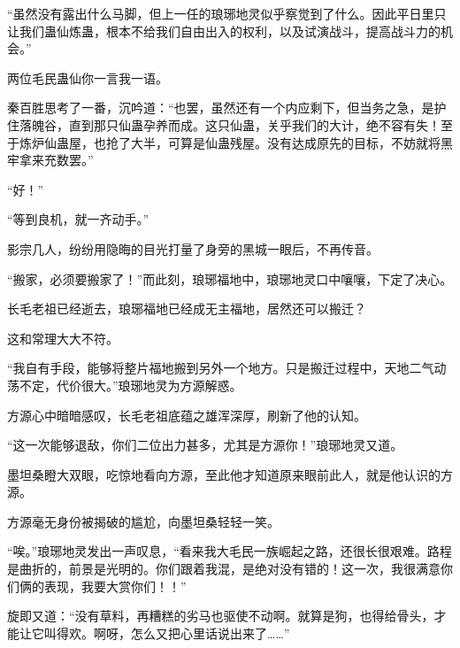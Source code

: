 \begin{this_body}
“虽然没有露出什么马脚，但上一任的琅琊地灵似乎察觉到了什么。因此平日里只让我们蛊仙炼蛊，根本不给我们自由出入的权利，以及试演战斗，提高战斗力的机会。”

两位毛民蛊仙你一言我一语。

秦百胜思考了一番，沉吟道：“也罢，虽然还有一个内应剩下，但当务之急，是护住落魄谷，直到那只仙蛊孕养而成。这只仙蛊，关乎我们的大计，绝不容有失！至于炼炉仙蛊屋，也抢了大半，可算是仙蛊残屋。没有达成原先的目标，不妨就将黑牢拿来充数罢。”

“好！”

“等到良机，就一齐动手。”

影宗几人，纷纷用隐晦的目光打量了身旁的黑城一眼后，不再传音。

“搬家，必须要搬家了！”而此刻，琅琊福地中，琅琊地灵口中嚷嚷，下定了决心。

长毛老祖已经逝去，琅琊福地已经成无主福地，居然还可以搬迁？

这和常理大大不符。

“我自有手段，能够将整片福地搬到另外一个地方。只是搬迁过程中，天地二气动荡不定，代价很大。”琅琊地灵为方源解惑。

方源心中暗暗感叹，长毛老祖底蕴之雄浑深厚，刷新了他的认知。

“这一次能够退敌，你们二位出力甚多，尤其是方源你！”琅琊地灵又道。

墨坦桑瞪大双眼，吃惊地看向方源，至此他才知道原来眼前此人，就是他认识的方源。

方源毫无身份被揭破的尴尬，向墨坦桑轻轻一笑。

“唉。”琅琊地灵发出一声叹息，“看来我大毛民一族崛起之路，还很长很艰难。路程是曲折的，前景是光明的。你们跟着我混，是绝对没有错的！这一次，我很满意你们俩的表现，我要大赏你们！！”

旋即又道：“没有草料，再糟糕的劣马也驱使不动啊。就算是狗，也得给骨头，才能让它叫得欢。啊呀，怎么又把心里话说出来了……”

\end{this_body}

